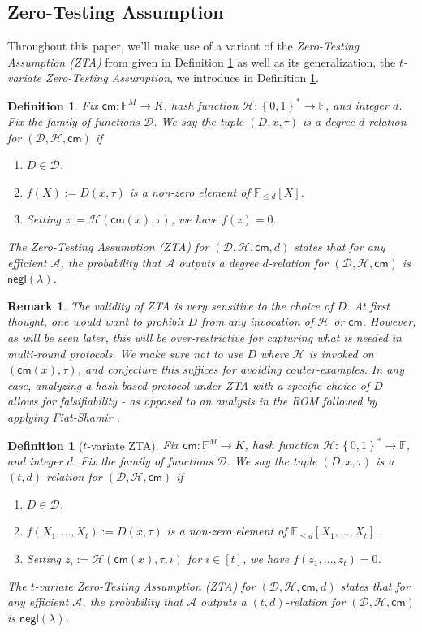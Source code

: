 \documentclass[11pt]{article} %
\newcommand{\F}{\ensuremath{\mathbb F}\xspace}
\newcommand{\adv}{\ensuremath{\mathcal A}\xspace}
\newcommand{\cm}{\ensuremath{\mathsf{cm}}\xspace}
\newcommand{\negl}{\ensuremath{\mathsf{negl}(\lambda)}\xspace}
\newcommand{\defeq}{:=}
\newcommand{\B}{\ensuremath{\set{0,1}}\xspace}
\newcommand{\hash}{\ensuremath{\mathcal{H}}\xspace}
\newcommand{\set}[1]{\ensuremath{\left\{#1\right\}}\xspace}
\newcommand{\polysofdegeq}[1]{\ensuremath{\F_{\leq #1}[X]}\xspace}
\newtheorem{dfn}[lemma]{Definition}
\newtheorem{remark}[lemma]{Remark}
\newcommand{\ztafuncs}{\ensuremath{\mathcal{D}}\xspace}
\begin{document}
\subsection{Zero-Testing Assumption}\label{subsec:zta}
Throughout this paper, we'll make use of a variant of the \emph{Zero-Testing Assumption (ZTA)} from \cite{novarecursive} given in Definition \ref{dfn:ZTA} as well as its generalization, the \emph{$t$-variate Zero-Testing Assumption}, we introduce in Definition \ref{dfn:multiZTA}.

\begin{dfn}\label{dfn:ZTA}
Fix $\cm:\F^M\to K$, hash function $\hash:\B^*\to \F$, and integer $d$. Fix the family of functions \ztafuncs.
We say the tuple $(D,x,\tau)$ is a \emph{degree $d$-relation for $(\ztafuncs,\hash,\cm)$} if
\begin{enumerate}
 \item $D\in \ztafuncs$.
 \item $f(X)\defeq D(x,\tau)$ is a non-zero element of \polysofdegeq{d}.
 \item Setting $z\defeq \hash(\cm(x),\tau)$, we have $f(z)=0$.
\end{enumerate}
The Zero-Testing Assumption (ZTA) for $(\ztafuncs,\hash,\cm,d)$ states that for any efficient \adv, the probability that
\adv outputs a degree $d$-relation for $(\ztafuncs,\hash,\cm)$ is \negl.
\end{dfn}

\begin{remark}
The validity of ZTA is very sensitive to the choice of $D$. At first thought, one would want to prohibit $D$ from \emph{any} invocation of \hash or \cm. However, as will be seen later, this will be over-restrictive for capturing what is needed in multi-round protocols. We make sure not to use $D$ where \hash is invoked on $(\cm(x),\tau)$, and conjecture this suffices for avoiding couter-examples. In any case, analyzing a hash-based protocol under ZTA with a specific choice of $D$  allows for falsifiability - as opposed to an analysis in the ROM followed by applying Fiat-Shamir .
\end{remark}



\begin{dfn}[$t$-variate ZTA]\label{dfn:multiZTA}
Fix $\cm:\F^M\to K$, hash function $\hash:\B^*\to \F$, and integer $d$. Fix the family of functions \ztafuncs.
We say the tuple $(D,x,\tau)$ is a \emph{$(t,d)$-relation for $(\ztafuncs,\hash,\cm)$} if
\begin{enumerate}
 \item $D\in \ztafuncs$.
 \item $f(X_1,\ldots,X_t)\defeq D(x,\tau)$ is a non-zero element of $\F_{\leq d}[X_1,\ldots,X_t]$.
 \item Setting $z_i\defeq \hash(\cm(x),\tau,i)$ for $i\in[t]$, we have $f(z_1,\ldots,z_t)=0$.
\end{enumerate}
The $t$-variate Zero-Testing Assumption (ZTA) for $(\ztafuncs,\hash,\cm,d)$ states that for any efficient \adv, the probability that
\adv outputs a $(t,d)$-relation for $(\ztafuncs,\hash,\cm)$ is \negl.
\end{dfn}
\end{document}

